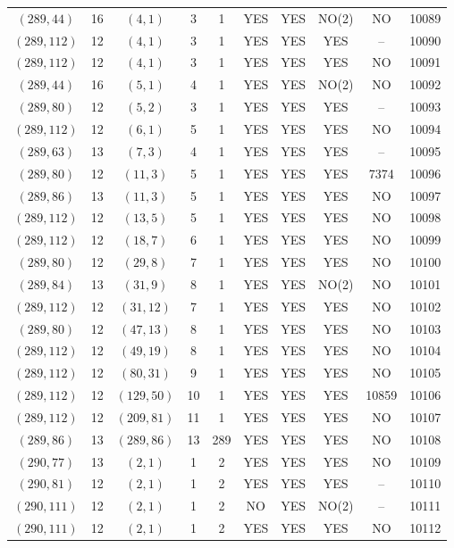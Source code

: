 \begin{longtable}{|c|c|c|c|c|c|c|c|c|c|}
$(289, 44)$ & 16 & $(4, 1)$ & 3 & 1 & YES & YES & NO(2) & NO & 10089\\
$(289, 112)$ & 12 & $(4, 1)$ & 3 & 1 & YES & YES & YES & -- & 10090\\
$(289, 112)$ & 12 & $(4, 1)$ & 3 & 1 & YES & YES & YES & NO & 10091\\
$(289, 44)$ & 16 & $(5, 1)$ & 4 & 1 & YES & YES & NO(2) & NO & 10092\\
$(289, 80)$ & 12 & $(5, 2)$ & 3 & 1 & YES & YES & YES & -- & 10093\\
$(289, 112)$ & 12 & $(6, 1)$ & 5 & 1 & YES & YES & YES & NO & 10094\\
$(289, 63)$ & 13 & $(7, 3)$ & 4 & 1 & YES & YES & YES & -- & 10095\\
$(289, 80)$ & 12 & $(11, 3)$ & 5 & 1 & YES & YES & YES & 7374 & 10096\\
$(289, 86)$ & 13 & $(11, 3)$ & 5 & 1 & YES & YES & YES & NO & 10097\\
$(289, 112)$ & 12 & $(13, 5)$ & 5 & 1 & YES & YES & YES & NO & 10098\\
$(289, 112)$ & 12 & $(18, 7)$ & 6 & 1 & YES & YES & YES & NO & 10099\\
$(289, 80)$ & 12 & $(29, 8)$ & 7 & 1 & YES & YES & YES & NO & 10100\\
$(289, 84)$ & 13 & $(31, 9)$ & 8 & 1 & YES & YES & NO(2) & NO & 10101\\
$(289, 112)$ & 12 & $(31, 12)$ & 7 & 1 & YES & YES & YES & NO & 10102\\
$(289, 80)$ & 12 & $(47, 13)$ & 8 & 1 & YES & YES & YES & NO & 10103\\
$(289, 112)$ & 12 & $(49, 19)$ & 8 & 1 & YES & YES & YES & NO & 10104\\
$(289, 112)$ & 12 & $(80, 31)$ & 9 & 1 & YES & YES & YES & NO & 10105\\
$(289, 112)$ & 12 & $(129, 50)$ & 10 & 1 & YES & YES & YES & 10859 & 10106\\
$(289, 112)$ & 12 & $(209, 81)$ & 11 & 1 & YES & YES & YES & NO & 10107\\
$(289, 86)$ & 13 & $(289, 86)$ & 13 & 289 & YES & YES & YES & NO & 10108\\
$(290, 77)$ & 13 & $(2, 1)$ & 1 & 2 & YES & YES & YES & NO & 10109\\
$(290, 81)$ & 12 & $(2, 1)$ & 1 & 2 & YES & YES & YES & -- & 10110\\
$(290, 111)$ & 12 & $(2, 1)$ & 1 & 2 & NO & YES & NO(2) & -- & 10111\\
$(290, 111)$ & 12 & $(2, 1)$ & 1 & 2 & YES & YES & YES & NO & 10112\\

\end{longtable}
